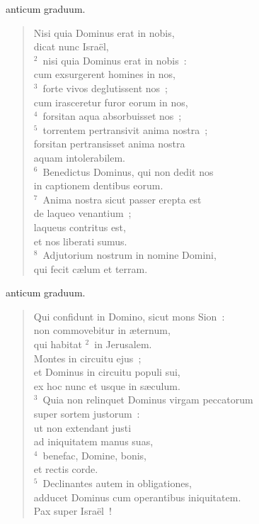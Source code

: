 \bchapter[Psalm]
anticum graduum. \begin{verse}Nisi quia Dominus erat in nobis,\\ dicat nunc Isra\"el,\\
${}^{2}$~nisi quia Dominus erat in nobis~:\\ cum exsurgerent homines in nos,\\
${}^{3}$~forte vivos deglutissent nos~;\\ cum irasceretur furor eorum in nos,\\
${}^{4}$~forsitan aqua absorbuisset nos~;\\
${}^{5}$~torrentem pertransivit anima nostra~;\\ forsitan pertransisset anima nostra\\ aquam intolerabilem.\\
${}^{6}$~Benedictus Dominus, qui non dedit nos\\ in captionem dentibus eorum.\\
${}^{7}$~Anima nostra sicut passer erepta est\\ de laqueo venantium~;\\ laqueus contritus est,\\ et nos liberati sumus.\\
${}^{8}$~Adjutorium nostrum in nomine Domini,\\ qui fecit c\ae lum et terram.\end{verse}



\bchapter[Psalm]
anticum graduum. \begin{verse}Qui confidunt in Domino, sicut mons Sion~:\\ non commovebitur in \ae ternum,\\ qui habitat
${}^{2}$~in Jerusalem.\\ Montes in circuitu ejus~;\\ et Dominus in circuitu populi sui,\\ ex hoc nunc et usque in s\ae culum.\\
${}^{3}$~Quia non relinquet Dominus virgam peccatorum\\ super sortem justorum~:\\ ut non extendant justi\\ ad iniquitatem manus suas,\\
${}^{4}$~benefac, Domine, bonis,\\ et rectis corde.\\
${}^{5}$~Declinantes autem in obligationes,\\ adducet Dominus cum operantibus iniquitatem.\\ Pax super Isra\"el~!\end{verse}



